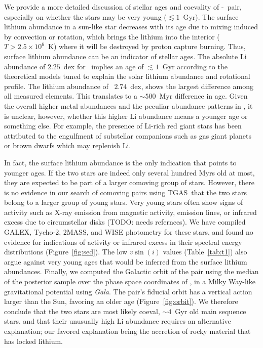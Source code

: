 \documentclass[12pt,letterpaper,margin=1in]{article}
\newcommand{\project}[1]{\textsl{#1}}
\newcommand{\acronym}[1]{{\small{#1}}}
\newcommand{\figname}{Figure}
\newcommand{\tgas}{\acronym{TGAS}}
\newcommand*\elem[1]{\ensuremath{\mathrm{#1}}}
\newcommand{\sunanalog}{\text{Krios}}
\newcommand{\bizarreone}{\text{Kronos}}
\newcommand{\todo}[1]{{\color{red}TODO: #1}}
\renewcommand\tablename{Table}
\begin{document}
We provide a more detailed discussion of stellar ages and coevality of
\bizarreone-\sunanalog\ pair, especially on whether the stars may be
very young ($\lesssim 1$~Gyr).
The surface lithium abundance in a sun-like star decreases with its age due to
mixing induced by convection or rotation, which brings the lithium into the
interior ($T>2.5 \times 10^{6}$~K) where it will be destroyed by proton capture
burning.
Thus, surface lithium abundance can be an indicator of stellar ages.
The absolute $\elem{Li}$ abundance of $2.25$~dex for \sunanalog\ implies an age
of $\lesssim 1$~Gyr according to the theoretical models tuned to explain the
solar lithium abundance and rotational profile\cite{2005Sci...309.2189C}.
The lithium abundance of \bizarreone\, $2.74$~dex, shows the largest difference
among all measured elements.
This translates to a $\sim 500$~Myr difference in age.
Given the overall higher metal abundances and the peculiar abundance patterns
in \bizarreone, it is unclear, however, whether this higher $\elem{Li}$
abundance means a younger age or something else.
For example, the presence of $\elem{Li}$-rich red giant stars has been
attributed to the engulfment of substellar companions such as gas giant planets
or brown dwarfs which may replenish $\elem{Li}$\cite{Casey:2016aa}.

In fact, the surface lithium abundance is the only indication that points to
younger ages.
If the two stars are indeed only several hundred Myrs old at most,
they are expected to be part of a larger comoving group of stars.
However, there is no evidence in our search\cite{2017AJ....153..257O} of
comoving pairs using \tgas\ that the two stars belong to a larger group of
young stars.
Very young stars often show signs of activity such as
X-ray emission from magnetic activity, emission lines, or infrared excess due to
circumstellar disks (\todo{needs refernces}).
We have compiled GALEX, Tycho-2, 2MASS, and WISE photometry for these stars, and
found no evidence for indications of activity or infrared excess in their
spectral energy distributions (\figname~\ref{fig:sed}).
The low $v\sin(i)$ values (\tablename~\ref{tab:t1}) also argue against very
young ages that would be inferred from the surface lithium abundances.
Finally, we computed the Galactic orbit of the pair using the median of the
posterior sample over the phase space coordinates of \sunanalog, in a Milky
Way-like gravitational potential\cite{Bovy:2015} using \project{Gala}\cite{gala}.
The pair's fiducial orbit has a vertical action larger than the Sun, favoring
an older age (\figname~\ref{fig:orbit}).
We therefore conclude that the two stars are most likely coeval, $\sim 4$~Gyr
old main sequence stars, and that their unusually high \elem{Li} abundance
requires an alternative explanation; our favored explanation being the accretion
of rocky material that has locked lithium.
\end{document}
